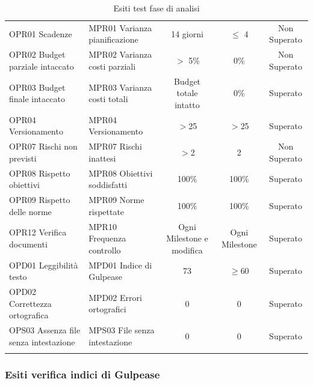 \documentclass[../piano_di_qualifica.tex]{subfiles}
\begin{document}
\begin{center}
\begin{longtable}{|p{4cm}|p{4cm}|c|c|c|}
		\hline
		\rowcolor{white}
		\multicolumn{5}{|c|}{\emph{Continua alla pagina successiva...}} \\
		\hline
		\endfoot
		\endlastfoot
		OPR01 Scadenze                        & MPR01 Varianza pianificazione & 14 giorni                 & $\leq$ 4             & Non Superato   \\
		OPR02 Budget parziale intaccato       & MPR02 Varianza costi parziali & $>$ 5\%                   & 0\%                  & Non Superato   \\
		OPR03 Budget finale intaccato         & MPR03 Varianza costi totali   & Budget totale intatto     & 0\%                  & Superato       \\
		OPR04 Versionamento                   & MPR04 Versionamento           & $>$25                     & $>$25                & Superato       \\
		OPR07 Rischi non previsti             & MPR07 Rischi inattesi         & $>$2                      & 2                    & Non Superato   \\
		OPR08 Rispetto obiettivi              & MPR08 Obiettivi soddisfatti   & 100\%                     & 100\%                & Superato       \\
		OPR09 Rispetto delle norme            & MPR09 Norme rispettate        & 100\%                     & 100\%                & Superato       \\
		OPR12 Verifica documenti              & MPR10 Frequenza controllo     & Ogni Milestone e modifica & Ogni Milestone       & Superato       \\
		OPD01 Leggibilità testo               & MPD01 Indice di Gulpease      & 73                        & \(\ge 60\)           & Superato       \\
		OPD02 Correttezza ortografica         & MPD02 Errori ortografici      & 0                         & 0                    & Superato       \\
		OPS03 Assenza file senza intestazione & MPS03 File senza intestazione & 0                         & 0                    & Superato       \\
		\hline
		\rowcolor{white}
		\caption{Esiti test fase di analisi}
	\end{longtable}
\end{center}

\subsubsection{Esiti verifica indici di Gulpease}
\label{sub:verif_gul_RR}
\end{document}
